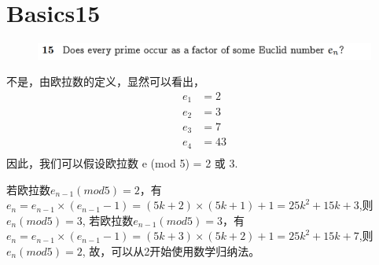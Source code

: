 \documentclass[]{article}
\begin{document}
\section*{Basics15}
\begin{figure}[H]
    \includegraphics[scale =0.6]{2023-03-13-16-11-46.png}
\end{figure}
不是，由欧拉数的定义，显然可以看出，
\begin{align}
    e_{1} &=2\\
    e_{2} &=3\\
    e_{3} &=7\\
    e_{4} &=43\\
\end{align}
    因此，我们可以假设欧拉数 e (mod 5) = 2 或 3.
\par 
若欧拉数$e_{n-1}(mod5) = 2$，有$e_{n} = e_{n-1} \times (e_{n-1} - 1) = (5k + 2)\times(5k+1) + 1 = 25k^2+15k+3$,则$e_{n}(mod 5) = 3$,
若欧拉数$e_{n-1}(mod5) = 3$，有$e_{n} = e_{n-1} \times (e_{n-1} - 1) = (5k + 3)\times(5k+2) +1= 25k^2+15k+7$,则$e_{n}(mod 5) = 2$,
故，可以从2开始使用数学归纳法。
\end{document}

